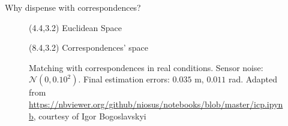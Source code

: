 \begin{frame}[noframenumbering]{Why dispense with correspondences?}

  \begin{figure}\vspace{1cm}
    \caption{Matching with correspondences in real conditions. Sensor noise:
             $\mathcal{N}(0, 0.10^2)$. Final estimation errors:
             $0.035$ m, $0.011$ rad. Adapted from
             \url{https://nbviewer.org/github/niosus/notebooks/blob/master/icp.ipynb},
              courtesy of Igor Bogoslavskyi}
    \begin{textblock}{3}(4.4,3.2)
      \scriptsize Euclidean Space
    \end{textblock}
    \begin{textblock}{4}(8.4,3.2)
      \scriptsize Correspondences' space
    \end{textblock}
  \end{figure}

\end{frame}
